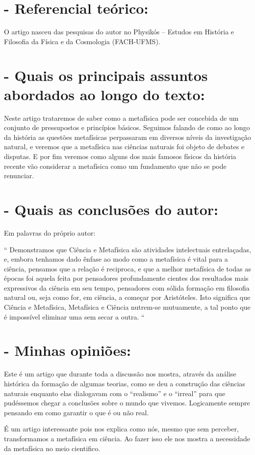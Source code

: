 \documentclass [a4paper, 12pt]{article}
\begin{document}
\section*{- Referencial teórico:}

O artigo nasceu das pesquisas do autor no Physikós – Estudos em História e Filosofia da Física e da Cosmologia (FACH-UFMS).

\section*{- Quais os principais assuntos abordados ao longo do texto:}

Neste artigo trataremos de saber como a metafísica pode ser concebida de um conjunto de pressupostos e princípios básicos. Seguimos falando de como ao longo da história as questões metafísicas perpassaram em diversos níveis da investigação natural, e veremos que a metafísica nas ciências naturais foi objeto de debates e disputas. E por fim veremos como alguns dos mais famosos físicos da história recente vão considerar a metafísica como um fundamento que não se pode renunciar.

\section*{- Quais as conclusões do autor:}

Em palavras do próprio autor: 

“ Demonstramos que Ciência e Metafísica são atividades intelectuais entrelaçadas, e, embora tenhamos dado ênfase ao modo como a metafísica é vital para a ciência, pensamos que a relação é reciproca, e que a melhor metafísica de todas as épocas foi aquela feita por pensadores profundamente cientes dos resultados mais expressivos da ciência em seu tempo, pensadores com sólida formação em filosofia natural ou, seja como for, em ciência, a começar por Aristóteles. Isto significa que Ciência e Metafísica, Metafísica e Ciência nutrem-se mutuamente, a tal ponto que é impossível eliminar uma sem secar a outra. “

\section*{- Minhas opiniões:}

Este é um artigo que durante toda a discussão nos mostra, através da análise histórica da formação de algumas teorias, como se deu a construção das ciências naturais enquanto elas dialogavam com o “realismo” e o “irreal” para que pudéssemos chegar a conclusões sobre o mundo que vivemos. Logicamente sempre pensando em como garantir o que é ou não real.

É um artigo interessante pois nos explica como nós, mesmo que sem perceber, transformamos a metafísica em ciência. Ao fazer isso ele nos mostra a necessidade  da metafísica no meio cientifico.
\end{document}
